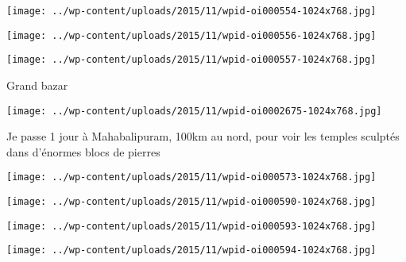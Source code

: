  

\begin{center} \texttt{[image: ../wp-content/uploads/2015/11/wpid-oi000554-1024x768.jpg]} \end{center}

 

 

\begin{center} \texttt{[image: ../wp-content/uploads/2015/11/wpid-oi000556-1024x768.jpg]} \end{center}

 

 

\begin{center} \texttt{[image: ../wp-content/uploads/2015/11/wpid-oi000557-1024x768.jpg]} \end{center}

 

 Grand bazar 

 

\begin{center} \texttt{[image: ../wp-content/uploads/2015/11/wpid-oi0002675-1024x768.jpg]} \end{center}

 

 Je passe 1 jour à Mahabalipuram, 100km au nord, pour voir les temples sculptés dans d'énormes blocs de pierres 

 

\begin{center} \texttt{[image: ../wp-content/uploads/2015/11/wpid-oi000573-1024x768.jpg]} \end{center}

 

 

\begin{center} \texttt{[image: ../wp-content/uploads/2015/11/wpid-oi000590-1024x768.jpg]} \end{center}

 

 

\begin{center} \texttt{[image: ../wp-content/uploads/2015/11/wpid-oi000593-1024x768.jpg]} \end{center}

 

 

\begin{center} \texttt{[image: ../wp-content/uploads/2015/11/wpid-oi000594-1024x768.jpg]} \end{center}

